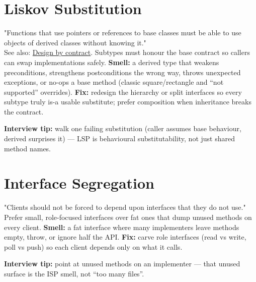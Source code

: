 \section{Liskov Substitution}
\label{sec:lsp}
    "Functions that use pointers or references to base classes must be able to use objects of derived classes without knowing it."~\cite{lsp} \\
    See also: \href{https://en.wikipedia.org/wiki/Design_by_contract}{Design by contract}. 
    \newline
    Subtypes must honour the base contract so callers can swap implementations safely.
    \newline
    \textbf{Smell:} a derived type that weakens preconditions, strengthens postconditions the wrong way, throws unexpected exceptions, or no-ops a base method (classic square/rectangle and ``not supported'' overrides).
    \newline
    \textbf{Fix:} redesign the hierarchy or split interfaces so every subtype truly is-a usable substitute; prefer composition when inheritance breaks the contract.
    \par\noindent\textbf{Interview tip:} walk one failing substitution (caller assumes base behaviour, derived surprises it) --- LSP is behavioural substitutability, not just shared method names.

\section{Interface Segregation}
\label{sec:isp}
    "Clients should not be forced to depend upon interfaces that they do not use."~\cite{isp}~\cite{martin-pap}
    \newline
    Prefer small, role-focused interfaces over fat ones that dump unused methods on every client.
    \newline
    \textbf{Smell:} a fat interface where many implementers leave methods empty, throw, or ignore half the API.
    \newline
    \textbf{Fix:} carve role interfaces (read vs write, poll vs push) so each client depends only on what it calls.
    \par\noindent\textbf{Interview tip:} point at unused methods on an implementer --- that unused surface is the ISP smell, not ``too many files''.

